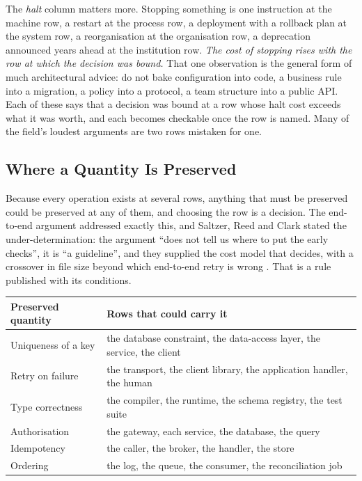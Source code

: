 \documentclass[11pt,oneside]{article}
\theoremstyle{definition}
\theoremstyle{remark}
\begin{document}
The \emph{halt} column matters more. Stopping something is one instruction at the machine
row, a restart at the process row, a deployment with a rollback plan at the system row, a
reorganisation at the organisation row, a deprecation announced years ahead at the
institution row. \emph{The cost of stopping rises with the row at which the decision was bound.} That one
observation is the general form of much architectural advice: do not bake configuration
into code, a business rule into a migration, a policy into a protocol, a team structure
into a public API. Each of these says that a decision was bound at a row whose halt cost
exceeds what it was worth, and each becomes checkable once the row is named. Many of the
field's loudest arguments are two rows mistaken for one.

\subsection{Where a Quantity Is Preserved}\label{sec:whopays}

Because every operation exists at several rows, anything that must be preserved could be
preserved at any of them, and choosing the row is a decision. The end-to-end argument
addressed exactly this, and Saltzer, Reed and Clark stated the under-determination: the argument
``does not tell us where to put the early checks'', it is ``a guideline'', and they supplied
the cost model that decides, with a crossover in file size beyond which end-to-end retry is
wrong \cite{saltzer1984}. That is a rule published with its conditions.

\begin{center}
\small
\begin{tabular}{@{}p{}p{}@{}}
\toprule
\textbf{Preserved quantity} & \textbf{Rows that could carry it} \\
\midrule
Uniqueness of a key & the database constraint, the data-access layer, the service, the client \\
Retry on failure & the transport, the client library, the application handler, the human \\
Type correctness & the compiler, the runtime, the schema registry, the test suite \\
Authorisation & the gateway, each service, the database, the query \\
Idempotency & the caller, the broker, the handler, the store \\
Ordering & the log, the queue, the consumer, the reconciliation job \\
\bottomrule
\end{tabular}
\end{center}
\end{document}
